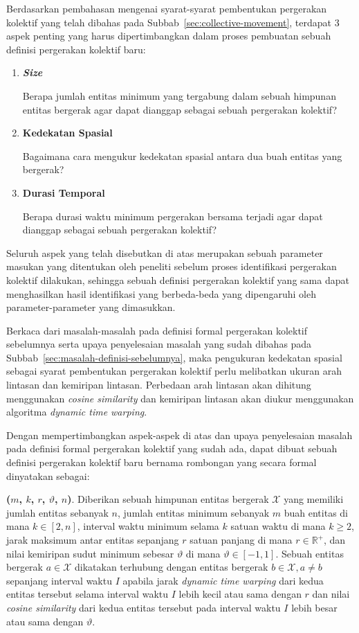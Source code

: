 Berdasarkan pembahasan mengenai syarat-syarat pembentukan pergerakan kolektif yang telah dibahas pada Subbab~\ref{sec:collective-movement}, terdapat 3 aspek penting yang harus dipertimbangkan dalam proses pembuatan sebuah definisi pergerakan kolektif baru:

\begin{enumerate}
    \item \textbf{\textit{Size}}
    
    Berapa jumlah entitas minimum yang tergabung dalam sebuah himpunan entitas bergerak agar dapat dianggap sebagai sebuah pergerakan kolektif?
    
    \item \textbf{Kedekatan Spasial}
    
    Bagaimana cara mengukur kedekatan spasial antara dua buah entitas yang bergerak?
    
    \item \textbf{Durasi Temporal}
    
    Berapa durasi waktu minimum pergerakan bersama terjadi agar dapat dianggap sebagai sebuah pergerakan kolektif?
\end{enumerate}

Seluruh aspek yang telah disebutkan di atas merupakan sebuah parameter masukan yang ditentukan oleh peneliti sebelum proses identifikasi pergerakan kolektif dilakukan, sehingga sebuah definisi pergerakan kolektif yang sama dapat menghasilkan hasil identifikasi yang berbeda-beda yang dipengaruhi oleh parameter-parameter yang dimasukkan.

Berkaca dari masalah-masalah pada definisi formal pergerakan kolektif sebelumnya serta upaya penyelesaian masalah yang sudah dibahas pada Subbab~\ref{sec:masalah-definisi-sebelumnya}, maka pengukuran kedekatan spasial sebagai syarat pembentukan pergerakan kolektif perlu melibatkan ukuran arah lintasan dan kemiripan lintasan. Perbedaan arah lintasan akan dihitung menggunakan \textit{cosine similarity} dan kemiripan lintasan akan diukur menggunakan algoritma \textit{dynamic time warping}.

Dengan mempertimbangkan aspek-aspek di atas dan upaya penyelesaian masalah pada definisi formal pergerakan kolektif yang sudah ada, dapat dibuat sebuah definisi pergerakan kolektif baru bernama rombongan yang secara formal dinyatakan sebagai:

\noindent \textbf{\pergerakankolektif($m$, $k$, $r$, $\vartheta$, $n$)}. Diberikan sebuah himpunan entitas bergerak $\mathcal{X}$ yang memiliki jumlah entitas sebanyak $n$, jumlah entitas minimum sebanyak $m$ buah entitas di mana $k \in [2, n]$, interval waktu minimum selama $k$ satuan waktu di mana $k \geq 2$, jarak maksimum antar entitas sepanjang $r$ satuan panjang di mana $r \in \mathbb{R}^+$, dan nilai kemiripan sudut minimum sebesar $\vartheta$ di mana $\vartheta \in [-1, 1]$. Sebuah entitas bergerak $a \in \mathcal{X}$ dikatakan terhubung dengan entitas bergerak $b \in \mathcal{X}, a \neq b$ sepanjang interval waktu $I$ apabila jarak \textit{dynamic time warping} dari kedua entitas tersebut selama interval waktu $I$ lebih kecil atau sama dengan $r$ dan nilai \textit{cosine similarity} dari kedua entitas tersebut pada interval waktu $I$ lebih besar atau sama dengan $\vartheta$.

